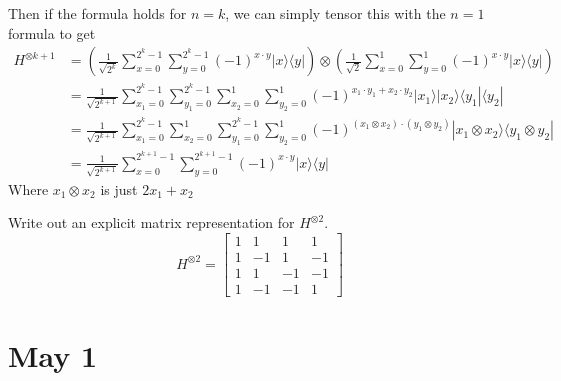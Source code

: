 \documentclass[]{article}
\newcommand{\bra}[1]{\langle #1 |}
\newcommand{\ket}[1]{| #1 \rangle}
\begin{document}
Then if the formula holds for $n=k$, we can simply tensor this with the $n=1$ formula to get
\begin{align*}
H^{\otimes k+1}
&=
\left(\frac{1}{\sqrt{2^k}}\sum_{x=0}^{2^k-1}\sum_{y=0}^{2^k-1}(-1)^{x \cdot y}\ket{x}\bra{y}\right)
\otimes
\left(\frac{1}{\sqrt{2}}\sum_{x=0}^1\sum_{y=0}^1(-1)^{x \cdot y}\ket{x}\bra{y}\right)
\\&=
\frac{1}{\sqrt{2^{k+1}}}
\sum_{x_1=0}^{2^k-1}
\sum_{y_1=0}^{2^k-1}
\sum_{x_2=0}^1
\sum_{y_2=0}^1
(-1)^{x_1 \cdot y_1 + x_2 \cdot y_2}
\ket{x_1}
\ket{x_2}
\bra{y_1}
\bra{y_2}
\\&=
\frac{1}{\sqrt{2^{k+1}}}
\sum_{x_1=0}^{2^k-1}
\sum_{x_2=0}^1
\sum_{y_1=0}^{2^k-1}
\sum_{y_2=0}^1
(-1)^{(x_1 \otimes x_2) \cdot (y_1 \otimes y_2)}
\ket{x_1 \otimes x_2}
\bra{y_1 \otimes y_2}
\\&=
\frac{1}{\sqrt{2^{k+1}}}
\sum_{x=0}^{2^{k+1}-1}
\sum_{y=0}^{2^{k+1}-1}
(-1)^{x \cdot y}
\ket{x}
\bra{y}
\end{align*}
Where $x_1 \otimes x_2$ is just $2x_1 + x_2$

Write out an explicit matrix representation for $H^{\otimes 2}$.
\[
H^{\otimes 2} =
\left[\begin{matrix}
1 & 1 & 1 & 1\\
1 &-1 & 1 &-1\\
1 & 1 &-1 &-1\\
1 &-1 &-1 & 1
\end{matrix}\right]
\]

\section{May 1}
\end{document}
